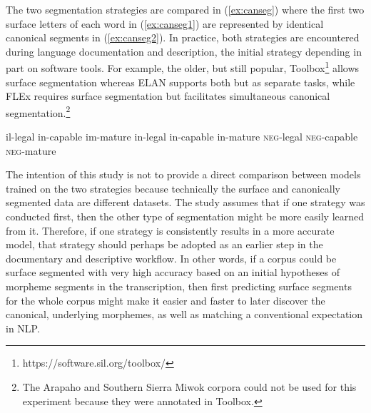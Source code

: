 The two segmentation strategies are compared in (\ref{ex:canseg}) where the first two surface letters of each word in (\ref{ex:canseg1}) are represented by identical canonical segments in (\ref{ex:canseg2}). In practice, both strategies are encountered during language documentation and description, the initial strategy depending in part on software tools. For example, the older, but still popular, Toolbox\footnote{https://software.sil.org/toolbox/} allows surface segmentation whereas ELAN \citep{auer_elan_2010} supports both but as separate tasks, while FLEx \citep{baines_overview_2018} requires surface segmentation but facilitates simultaneous canonical segmentation.\footnote{The Arapaho and Southern Sierra Miwok corpora could not be used for this experiment because they were annotated in Toolbox.}  


\pex   
\label{ex:canseg}
\a il-legal \hspace{6mm} in-capable \hspace{5mm} im-mature
\label{ex:canseg1}
\a in-legal \hspace{5mm} in-capable \hspace{5mm} in-mature
\label{ex:canseg2}
\a \textsc{neg}-legal \hspace{1mm} \textsc{neg}-capable \hspace{1mm} \textsc{neg}-mature
\label{ex:canseg3}
\xe


The intention of this study is not to provide a direct comparison between models trained on the two strategies because technically the surface and canonically segmented data are different datasets. The study assumes that if one strategy was conducted first, then the other type of segmentation might be more easily learned from it. Therefore, if one strategy is consistently results in a more accurate model, that strategy should perhaps be adopted as an earlier step in the documentary and descriptive workflow. In other words, if a corpus could be surface segmented with very high accuracy based on an initial hypotheses of morpheme segments in the transcription, then first predicting surface segments for the whole corpus might make it easier and faster to later discover the canonical, underlying morphemes, as well as matching a conventional expectation in NLP. 

